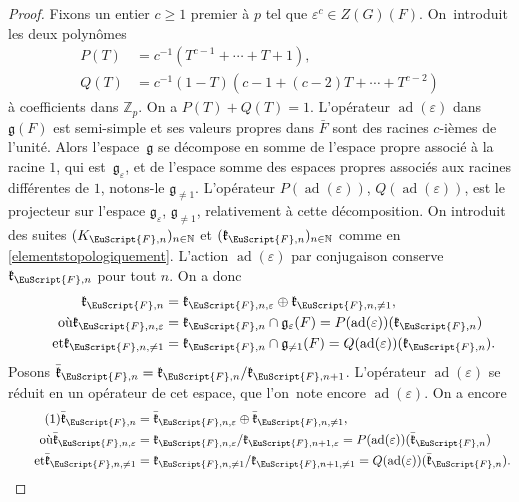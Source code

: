 \documentclass[JEP,XML,SOM,Unicode,francais]{cedram}
\let\mathcal \EuScript
\let\epsilon\varepsilon
\newcommand{\frg}{\mathfrak{g}}
\newcommand{\frk}{\mathfrak{k}}
\DeclareMathOperator{\ad}{ad}
\newcommand{\cF}{\mathcal{F}}
\newcommand{\NN}{\mathbb{N}}
\newcommand{\ZZ}{\mathbb{Z}}
\theoremstyle{plain}
\theoremstyle{definition}
\begin{document}
\begin{proof}
Fixons un entier $c\geq1$ premier à $p$ tel que $\epsilon^c\in Z(G)(F)$. On~intro\-duit les deux polynômes
\begin{align*}
P(T)&=c^{-1}(T^{c-1}+\cdots+T+1),\\
Q(T)&=c^{-1}(1-T)(c-1+(c-2)T+\cdots+T^{c-2})
\end{align*}
à coefficients dans $\ZZ_{p}$. On a $P(T)+Q(T)=1$.
L'opérateur $\ad(\epsilon)$ dans $\frg(F)$ est semi-simple et ses valeurs propres dans $\bar{F}$ sont des racines $c$-ièmes de l'unité. Alors l'espace~$\frg$ se décompose en somme de l'espace propre associé à la racine $1$, qui est~$\frg_{\epsilon}$, et de l'espace somme des espaces propres associés aux racines différentes de $1$, notons-le $\frg_{\neq1}$. L'opérateur $P(\ad(\epsilon))$, \resp $Q(\ad(\epsilon))$, est le projecteur sur l'espace $\frg_{\epsilon}$, \resp $\frg_{\neq1}$, relativement à cette décomposition.
On introduit des suites $(K_{\cF,n})_{n\in \NN}$ et $(\frk_{\cF,n})_{n\in \NN}$ comme en \ref{elementstopologiquement}. L'action $\ad(\epsilon)$ par conjugaison conserve $\frk_{\cF,n}$ pour tout $n$. On a donc
\begin{align*}
\frk_{\cF,n}&=\frk_{\cF,n,\epsilon}\oplus \frk_{\cF,n,\neq1},
\\
\tag*{où}
\frk_{\cF,n,\epsilon}&=\frk_{\cF,n}\cap \frg_{\epsilon}(F)=P(\ad(\epsilon))(\frk_{\cF,n})\\
\tag*{et}
\frk_{\cF,n,\neq1}&=\frk_{\cF,n}\cap \frg_{\neq1}(F)=Q(\ad(\epsilon))(\frk_{\cF,n}).
\end{align*}
Posons $\bar{\frk}_{\cF,n}=\frk_{\cF,n}/\frk_{\cF,n+1}$. L'opérateur $\ad(\epsilon)$ se réduit en un opérateur de cet espace, que l'on~note encore $\ad(\epsilon)$. On a encore
\begin{align*}
\tag{1}\label{commutant1}
\bar{\frk}_{\cF,n}&=\bar{\frk}_{\cF,n,\epsilon}\oplus \bar{\frk}_{\cF,n,\neq1},
\\
\tag*{où}
\bar{\frk}_{\cF,n,\epsilon}&=\frk_{\cF,n,\epsilon}/\frk_{\cF,n+1,\epsilon}=P(\ad(\epsilon))(\bar{\frk}_{\cF,n})\\
\tag*{et}
\bar{\frk}_{\cF,n,\neq1}&=\frk_{\cF,n,\neq1}/\frk_{\cF,n+1,\neq1}=Q(\ad(\epsilon))(\bar{\frk}_{\cF,n}).
\end{align*}


\end{proof}
\end{document}
